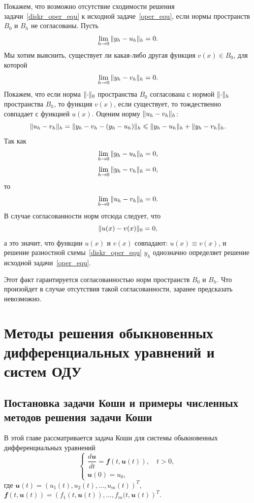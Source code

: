\documentclass[11pt,a4paper,twoside,listtotoc,bibtotoc]{report}
\numberwithin{equation}{section}
\theoremstyle{definition}
\theoremstyle{plain}
\DeclarePairedDelimiter\norm{\lVert}{\rVert}
\newcommand{\vfunc}[1]{\mathbfit{#1}}
\begin{document}
Покажем, что возможно отсутствие сходимости решения
задачи~\eqref{diskr_oper_equ} к исходной задаче~\eqref{oper_equ}, если нормы
пространств $B_0$ и $B_h$ не согласованы.
Пусть
%
$$
    \lim_{h\rightarrow0}{\norm{y_h-u_h}_h}=0.
$$
%
Мы хотим выяснить, существует ли какая-либо другая функция $v(x)\in B_0$, для которой
%
$$
    \lim_{h\rightarrow0}{\norm{y_h-v_h}_h}=0.
$$
%
Покажем, что если норма $\norm{\cdot}_0$ пространства $B_0$ согласована
с нормой $\norm{\cdot}_h$ пространства $B_h$, то функция $v(x)$, если существует,
то тождественно совпадает с
функцией $u(x)$.
Оценим норму $\norm{u_h-v_h}_h$:
%
$$
    \norm{u_h-v_h}_h=\norm{y_h-v_h-(y_h-u_h)}_h\leqslant \norm{y_h-u_h}_h
    +\norm{y_h-v_h}_h.
$$
%
Так как
%
$$
    \lim_{h\rightarrow0}{\norm{y_h-u_h}_h} = 0,
$$
%
%
$$
    \lim_{h\rightarrow0}{\norm{y_h-v_h}_h} = 0,
$$
%
то
%
$$
    \lim_{h\rightarrow0}{\norm{u_h-v_h}_h} = 0.
$$
%
В случае согласованности норм отсюда следует, что
%
$$
    \norm{u(x) - v(x)}_0 = 0,
$$
%
а это значит, что функции $u(x)$ и $v(x)$ совпадают: $u(x)\equiv v(x)$,
и решение разностной схемы~\eqref{diskr_oper_equ} $y_h$ однозначно определяет
решение исходной задачи~\eqref{oper_equ}.

Этот факт гарантируется согласованностью норм пространств $B_0$ и $B_h$.
Что произойдет в случае отсутствия такой согласованности, заранее предсказать невозможно.
%
\newpage
%
%
\chapter{Методы решения обыкновенных дифференциальных уравнений и систем ОДУ}
%
%
\section[Постановка задачи Коши и численные методы ее решения]{Постановка задачи Коши и примеры численных методов решения задачи Коши}
%
В этой главе рассматривается задача Коши для системы обыкновенных дифференциальных
уравнений
\begin{equation}
%
    \label{Koshi_sys}
    \begin{cases}
        \dfrac{d\vfunc{u}}{dt} = \vfunc{f}(t, \vfunc{u}(t)), \quad t > 0, \\
        \vfunc{u}(0) = u_0,
    \end{cases}
\end{equation}
%
где
$\vfunc{u}(t) = \left(u_1(t), u_2(t), \dots, u_m(t)\right)^T$,
~~$\vfunc{f}(t, \vfunc{u}(t)) = \left(f_1(t, \vfunc{u}(t)), \dots, f_m(t,\vfunc{u}(t)\right)^T$.
\end{document}
